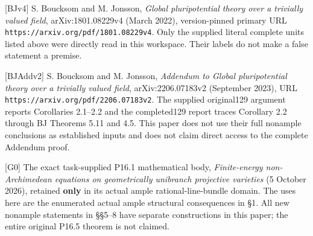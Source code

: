 \documentclass[10pt]{article}
\begin{document}
{[}BJv4{]} S. Boucksom and M. Jonsson, \emph{Global pluripotential
theory over a trivially valued field}, arXiv:1801.08229v4 (March 2022),
version-pinned primary URL \texttt{https://arxiv.org/pdf/1801.08229v4}.
Only the supplied literal complete units listed above were directly read
in this workspace. Their labels do not make a false statement a premise.

{[}BJAddv2{]} S. Boucksom and M. Jonsson, \emph{Addendum to Global
pluripotential theory over a trivially valued field}, arXiv:2206.07183v2
(September 2023), URL \texttt{https://arxiv.org/pdf/2206.07183v2}. The
supplied original129 argument reports Corollaries 2.1--2.2 and the
completed129 report traces Corollary 2.2 through BJ Theorems 5.11 and
4.5. This paper does not use their full nonample conclusions as
established inputs and does not claim direct access to the complete
Addendum proof.

{[}G0{]} The exact task-supplied P16.1 mathematical body,
\emph{Finite-energy non-Archimedean equations on geometrically unibranch
projective varieties} (5 October 2026), retained \textbf{only} in its
actual ample rational-line-bundle domain. The uses here are the
enumerated actual ample structural consequences in §1. All new nonample
statements in §§5--8 have separate constructions in this paper; the
entire original P16.5 theorem is not claimed.
\end{document}
